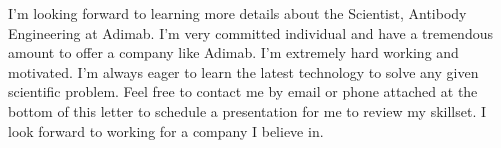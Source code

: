 \documentclass[11pt,a4paper,sans]{moderncv}        %
\newcommand{\Position}{Scientist, Antibody Engineering }
\newcommand{\Company}{Adimab}
\begin{document}
I'm looking forward to learning more details about the \Position at \Company. I'm very committed individual and have a tremendous amount to offer a company like \Company. I'm extremely hard working and motivated. I'm always eager to learn the latest technology to solve any given scientific problem. Feel free to contact me by email or phone attached at the bottom of this letter to schedule a presentation for me to review my skillset. I look forward to working for a company I believe in. 

\makeletterclosing
\end{document}
